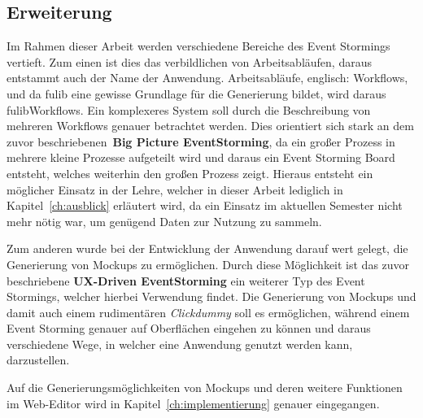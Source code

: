 \subsection{Erweiterung}\label{subsec:erweiterung}
Im Rahmen dieser Arbeit werden verschiedene Bereiche des Event Stormings vertieft.
Zum einen ist dies das verbildlichen von Arbeitsabläufen, daraus entstammt auch der Name der Anwendung.
Arbeitsabläufe, englisch: Workflows, und da fulib eine gewisse Grundlage für die Generierung bildet, wird daraus fulibWorkflows.
Ein komplexeres System soll durch die Beschreibung von mehreren Workflows genauer betrachtet werden.
Dies orientiert sich stark an dem zuvor beschriebenen~\textbf{Big Picture EventStorming}, da ein großer Prozess in mehrere kleine
Prozesse aufgeteilt wird und daraus ein Event Storming Board entsteht, welches weiterhin den großen Prozess zeigt.
Hieraus entsteht ein möglicher Einsatz in der Lehre, welcher in dieser Arbeit lediglich in Kapitel~\ref{ch:ausblick} erläutert wird,
da ein Einsatz im aktuellen Semester nicht mehr nötig war, um genügend Daten zur Nutzung zu sammeln.

Zum anderen wurde bei der Entwicklung der Anwendung darauf wert gelegt, die Generierung von Mockups zu ermöglichen.
Durch diese Möglichkeit ist das zuvor beschriebene \textbf{UX-Driven EventStorming} ein weiterer Typ des Event Stormings, welcher hierbei Verwendung findet.
Die Generierung von Mockups und damit auch einem rudimentären \textit{Clickdummy} soll es ermöglichen, während einem Event Storming genauer auf Oberflächen eingehen zu können
und daraus verschiedene Wege, in welcher eine Anwendung genutzt werden kann, darzustellen.

Auf die Generierungsmöglichkeiten von Mockups und deren weitere Funktionen im Web-Editor wird in Kapitel~\ref{ch:implementierung} genauer eingegangen.

